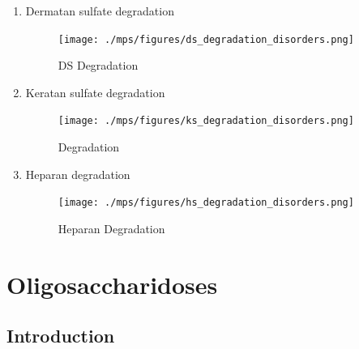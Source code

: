 \documentclass{scrartcl}
\begin{document}
\begin{enumerate}
\item Dermatan sulfate degradation
\label{sec:org0afb56b}
\begin{figure}[htbp]
\centering
\texttt{[image: ./mps/figures/ds\_degradation\_disorders.png]}
\caption[DS Degradation]{\label{fig:org641efb2}
DS Degradation}
\end{figure}


\item Keratan sulfate degradation
\label{sec:org027c79a}

\begin{figure}[htbp]
\centering
\texttt{[image: ./mps/figures/ks\_degradation\_disorders.png]}
\caption[KS Degradation]{\label{fig:orgc28c5e7}
Degradation}
\end{figure}


\item Heparan degradation
\label{sec:orgcaf8f0b}

\begin{figure}[htbp]
\centering
\texttt{[image: ./mps/figures/hs\_degradation\_disorders.png]}
\caption[HS Degradation]{\label{fig:org886cb34}
Heparan Degradation}
\end{figure}
\end{enumerate}

\section{Oligosaccharidoses}
\label{sec:org14eb938}
\subsection{Introduction}
\label{sec:orga8e8f7e}
\end{document}
